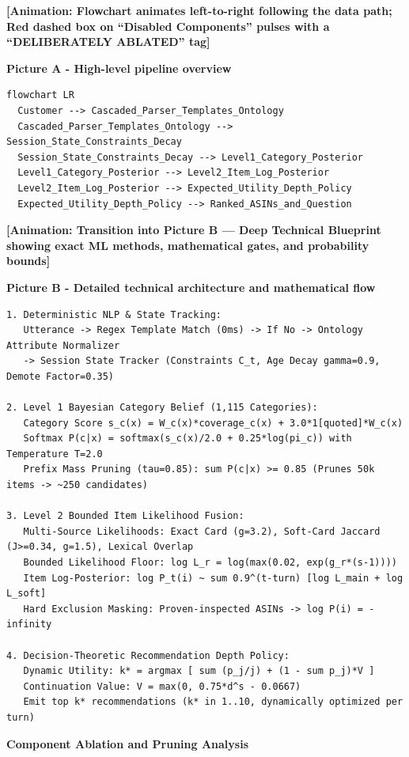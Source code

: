 \documentclass[11pt]{article}
\begin{document}
\textbf{[Animation: Flowchart animates left-to-right following the data path; Red dashed box on ``Disabled Components'' pulses with a ``DELIBERATELY ABLATED'' tag]}

\textbf{Picture A - High-level pipeline overview}

\begin{lstlisting}
flowchart LR
  Customer --> Cascaded_Parser_Templates_Ontology
  Cascaded_Parser_Templates_Ontology --> Session_State_Constraints_Decay
  Session_State_Constraints_Decay --> Level1_Category_Posterior
  Level1_Category_Posterior --> Level2_Item_Log_Posterior
  Level2_Item_Log_Posterior --> Expected_Utility_Depth_Policy
  Expected_Utility_Depth_Policy --> Ranked_ASINs_and_Question
\end{lstlisting}

\textbf{[Animation: Transition into Picture B --- Deep Technical Blueprint showing exact ML methods, mathematical gates, and probability bounds]}

\textbf{Picture B - Detailed technical architecture and mathematical flow}

\begin{lstlisting}
1. Deterministic NLP & State Tracking:
   Utterance -> Regex Template Match (0ms) -> If No -> Ontology Attribute Normalizer
   -> Session State Tracker (Constraints C_t, Age Decay gamma=0.9, Demote Factor=0.35)

2. Level 1 Bayesian Category Belief (1,115 Categories):
   Category Score s_c(x) = W_c(x)*coverage_c(x) + 3.0*1[quoted]*W_c(x)
   Softmax P(c|x) = softmax(s_c(x)/2.0 + 0.25*log(pi_c)) with Temperature T=2.0
   Prefix Mass Pruning (tau=0.85): sum P(c|x) >= 0.85 (Prunes 50k items -> ~250 candidates)

3. Level 2 Bounded Item Likelihood Fusion:
   Multi-Source Likelihoods: Exact Card (g=3.2), Soft-Card Jaccard (J>=0.34, g=1.5), Lexical Overlap
   Bounded Likelihood Floor: log L_r = log(max(0.02, exp(g_r*(s-1))))
   Item Log-Posterior: log P_t(i) ~ sum 0.9^(t-turn) [log L_main + log L_soft]
   Hard Exclusion Masking: Proven-inspected ASINs -> log P(i) = -infinity

4. Decision-Theoretic Recommendation Depth Policy:
   Dynamic Utility: k* = argmax [ sum (p_j/j) + (1 - sum p_j)*V ]
   Continuation Value: V = max(0, 0.75*d^s - 0.0667)
   Emit top k* recommendations (k* in 1..10, dynamically optimized per turn)
\end{lstlisting}

\textbf{Component Ablation and Pruning Analysis}
\end{document}

